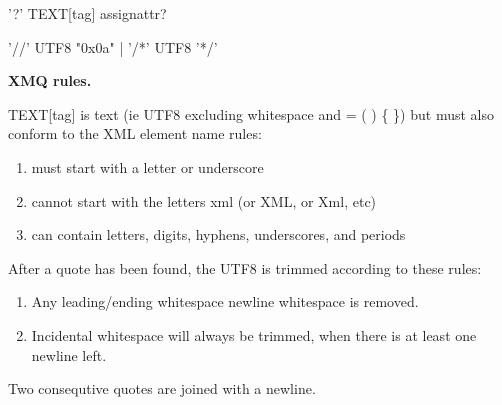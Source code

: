 \documentclass[10pt,a4paper]{article}
\begin{document}
\raisebox{8pt}{pi:}
\begin{minipage}{15cm}
\begin{rail}
'?' TEXT[tag] assignattr?
\end{rail}
\end{minipage}

\raisebox{8pt}{COMMENT:}
\begin{minipage}{15cm}
\begin{rail}
  '//' UTF8 "0x0a"
  | '/*' UTF8 '*/'
\end{rail}
\end{minipage}

\textbf{XMQ rules.}

TEXT[tag] is text (ie UTF8 excluding whitespace and = ( ) \{ \})
but must also conform to the XML element name rules:
\begin{enumerate}
  \item{must start with a letter or underscore}
  \item{cannot start with the letters xml (or XML, or Xml, etc)}
  \item{can contain letters, digits, hyphens, underscores, and periods}
\end{enumerate}

After a quote has been found, the UTF8 is trimmed according to these rules:
\begin{enumerate}
\item{Any leading/ending whitespace newline whitespace is removed.}
\item{Incidental whitespace will always be trimmed, when there is at least one newline left.}
\end{enumerate}

Two consequtive quotes are joined with a newline.
\end{document}
